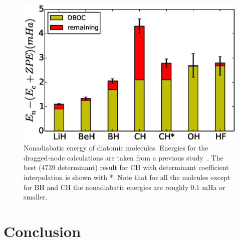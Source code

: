 \documentclass[aip,jcp,numerical,reprint]{revtex4-1}
\begin{document}
\begin{figure}[h]
\includegraphics[scale=0.5]{4738}
\caption{Nonadiabatic energy of diatomic molecules.   Energies for the dragged-node calculations are taken from a previous study~\cite{Yang2015}. The best (4739 determinant) result for CH with determinant coefficient interpolation is shown with *.  Note that for all the molcules except for BH and CH the nonadiabatic energies are roughly 0.1 mHa or smaller. }
\end{figure}

\section{Conclusion}
\end{document}
